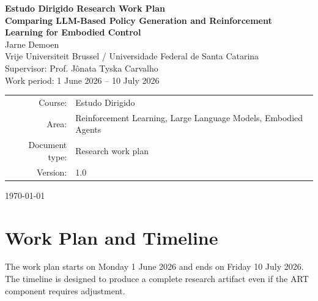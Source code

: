 \documentclass[11pt,a4paper]{article}
\begin{document}
\begin{titlepage}
    \centering
    {\Large \textbf{Estudo Dirigido Research Work Plan}}\\[0.6cm]
    {\LARGE \textbf{Comparing LLM-Based Policy Generation and Reinforcement Learning for Embodied Control}}\\[1.0cm]
    {\large Jarne Demoen}\\[0.2cm]
    {Vrije Universiteit Brussel / Universidade Federal de Santa Catarina}\\[0.8cm]
    {\large Supervisor: Prof. J\^{o}nata Tyska Carvalho}\\[1.0cm]
    {\large Work period: 1 June 2026 -- 10 July 2026}\\[1.0cm]
    \vfill
    \begin{tabular}{rl}
        Course: & Estudo Dirigido \\
        Area: & Reinforcement Learning, Large Language Models, Embodied Agents \\
        Document type: & Research work plan \\
        Version: & 1.0 \\
    \end{tabular}
    \vfill
    {\large \today}
\end{titlepage}

\section{Work Plan and Timeline}

The work plan starts on Monday 1 June 2026 and ends on Friday 10 July 2026. The timeline is designed to produce a complete research artifact even if the ART component requires adjustment.
\end{document}
